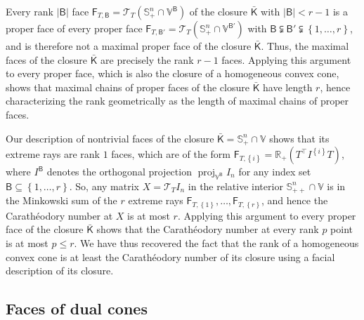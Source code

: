 \documentclass[oneside]{amsart}
\theoremstyle{plain}
\theoremstyle{definition}
\theoremstyle{remark}
\numberwithin{equation}{section}
\DeclareMathOperator{\proj}{proj}
\begin{document}
Every rank $\lvert \mathsf{B} \rvert$ face $\mathsf{F}_{T,\mathsf{B}} =
\mathcal{T}_{T}(\mathbb{S}^{n}_{+} \cap \mathbb{V}^{\mathsf{B}})$ of the
closure $\bar{\mathsf{K}}$ with $\lvert \mathsf{B} \rvert < r-1$ is a
proper face of every proper face $\mathsf{F}_{T,\mathsf{B}'} =
\mathcal{T}_{T}(\mathbb{S}^{n}_{+} \cap \mathbb{V}^{\mathsf{B}'})$ with
$\mathsf{B} \subsetneqq \mathsf{B}' \subsetneqq \left\{1, \dotsc,
r\right\}$, and is therefore not a maximal proper face of the closure
$\bar{\mathsf{K}}$. Thus, the maximal faces of the closure
$\bar{\mathsf{K}}$ are precisely the rank $r-1$ faces. Applying this
argument to every proper face, which is also the closure of a homogeneous
convex cone, shows that maximal chains of proper faces of the closure
$\bar{\mathsf{K}}$ have length $r$, hence characterizing the rank
geometrically as the length of maximal chains of proper faces.

Our description of nontrivial faces of the closure $\bar{\mathsf{K}} =
\mathbb{S}^{n}_{+} \cap \mathbb{V}$ shows that its extreme rays are rank
$1$ faces, which are of the form $\mathsf{F}_{T,\left\{i\right\}} =
\mathbb{R}_+ (T^{\top} I^{\left\{i\right\}} T)$, where $I^{\mathsf{B}}$
denotes the orthogonal projection $\proj_{\mathbb{V}^{\mathsf{B}}} I_{n}$
for any index set $\mathsf{B} \subseteq \left\{1, \dotsc, r\right\}$. So,
any matrix $X = \mathcal{T}_{T} I_{n}$ in the relative interior
$\mathbb{S}^{n}_{++} \cap \mathbb{V}$ is in the Minkowski sum of the $r$
extreme rays $\mathsf{F}_{T,\left\{1\right\}}, \dotsc,
\mathsf{F}_{T,\left\{r\right\}}$, and hence the Carath\'eodory number at
$X$ is at most $r$. Applying this argument to every proper face of the
closure $\bar{\mathsf{K}}$ shows that the Carath\'eodory number at every
rank $p$ point is at most $p \leq r$. We have thus recovered the fact that
the rank of a homogeneous convex cone is at least the Carath\'eodory number
of its closure using a facial description of its closure.

\subsection{Faces of dual cones}
\label{section:facialstructuredual}
\end{document}
